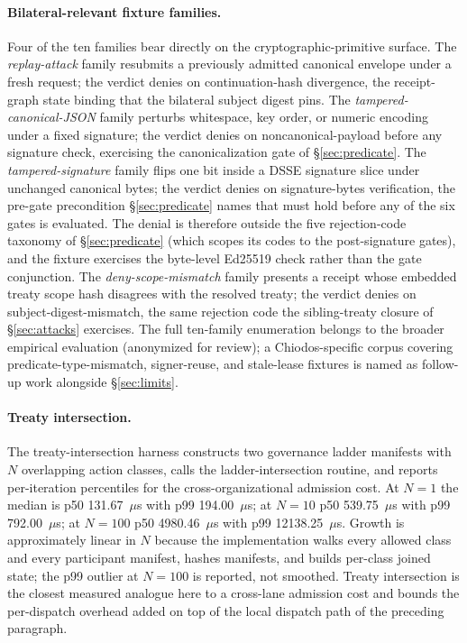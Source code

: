 \paragraph{Bilateral-relevant fixture families.} Four of the ten families bear directly on the cryptographic-primitive surface. The \emph{replay-attack} family resubmits a previously admitted canonical envelope under a fresh request; the verdict denies on continuation-hash divergence, the receipt-graph state binding that the bilateral subject digest pins. The \emph{tampered-canonical-JSON} family perturbs whitespace, key order, or numeric encoding under a fixed signature; the verdict denies on noncanonical-payload before any signature check, exercising the canonicalization gate of \S\ref{sec:predicate}. The \emph{tampered-signature} family flips one bit inside a DSSE signature slice under unchanged canonical bytes; the verdict denies on signature-bytes verification, the pre-gate precondition \S\ref{sec:predicate} names that must hold before any of the six gates is evaluated. The denial is therefore outside the five rejection-code taxonomy of \S\ref{sec:predicate} (which scopes its codes to the post-signature gates), and the fixture exercises the byte-level Ed25519 check rather than the gate conjunction. The \emph{deny-scope-mismatch} family presents a receipt whose embedded treaty scope hash disagrees with the resolved treaty; the verdict denies on subject-digest-mismatch, the same rejection code the sibling-treaty closure of \S\ref{sec:attacks} exercises. The full ten-family enumeration belongs to the broader empirical evaluation (anonymized for review); a Chiodos-specific corpus covering predicate-type-mismatch, signer-reuse, and stale-lease fixtures is named as follow-up work alongside \S\ref{sec:limits}.

\paragraph{Treaty intersection.} The treaty-intersection harness constructs two governance ladder manifests with $N$ overlapping action classes, calls the ladder-intersection routine, and reports per-iteration percentiles for the cross-organizational admission cost. At $N{=}1$ the median is p50 131.67~$\mu$s with p99 194.00~$\mu$s; at $N{=}10$ p50 539.75~$\mu$s with p99 792.00~$\mu$s; at $N{=}100$ p50 4980.46~$\mu$s with p99 12138.25~$\mu$s. Growth is approximately linear in $N$ because the implementation walks every allowed class and every participant manifest, hashes manifests, and builds per-class joined state; the p99 outlier at $N{=}100$ is reported, not smoothed. Treaty intersection is the closest measured analogue here to a cross-lane admission cost and bounds the per-dispatch overhead added on top of the local dispatch path of the preceding paragraph.

